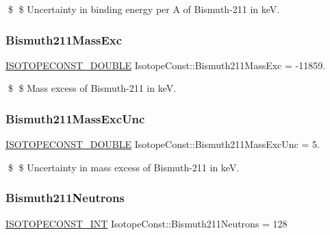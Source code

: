 \$ \$ Uncertainty in binding energy per A of Bismuth-\/211 in keV. \mbox{\label{group___isotope_const-_bismuth-_bi211_ga090e9718f6dea92a9d66f017815e438f}} 
\subsubsection{\texorpdfstring{Bismuth211\+Mass\+Exc}{Bismuth211MassExc}}
{\footnotesize\ttfamily \mbox{\hyperlink{group___isotope_const-_macros_ga8f45a7272ce02c0b4c65c44636ed719a}{I\+S\+O\+T\+O\+P\+E\+C\+O\+N\+S\+T\+\_\+\+D\+O\+U\+B\+LE}} Isotope\+Const\+::\+Bismuth211\+Mass\+Exc = -\/11859.}

\$ \$ Mass excess of Bismuth-\/211 in keV. \mbox{\label{group___isotope_const-_bismuth-_bi211_ga4e54c6a6ff9528c23f8aca2ce7d290ce}} 
\subsubsection{\texorpdfstring{Bismuth211\+Mass\+Exc\+Unc}{Bismuth211MassExcUnc}}
{\footnotesize\ttfamily \mbox{\hyperlink{group___isotope_const-_macros_ga8f45a7272ce02c0b4c65c44636ed719a}{I\+S\+O\+T\+O\+P\+E\+C\+O\+N\+S\+T\+\_\+\+D\+O\+U\+B\+LE}} Isotope\+Const\+::\+Bismuth211\+Mass\+Exc\+Unc = 5.}

\$ \$ Uncertainty in mass excess of Bismuth-\/211 in keV. \mbox{\label{group___isotope_const-_bismuth-_bi211_ga7ab071d217f4ad2d059486fc560ea0ee}} 
\subsubsection{\texorpdfstring{Bismuth211\+Neutrons}{Bismuth211Neutrons}}
{\footnotesize\ttfamily \mbox{\hyperlink{group___isotope_const-_macros_ga5f18360b3e99483a35c32d789e62621c}{I\+S\+O\+T\+O\+P\+E\+C\+O\+N\+S\+T\+\_\+\+I\+NT}} Isotope\+Const\+::\+Bismuth211\+Neutrons = 128}


